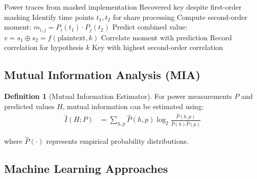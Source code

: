 \documentclass[11pt,a4paper]{article}
\theoremstyle{definition}
\newtheorem{definition}{Definition}[section]
\begin{document}
\begin{algorithm}
\caption{Second-Order Power Analysis}
\begin{algorithmic}[1]
\REQUIRE Power traces from masked implementation
\ENSURE Recovered key despite first-order masking
        \STATE Identify time points $t_1, t_2$ for share processing
        \STATE Compute second-order moment: $m_{i,j} = P_i(t_1) \cdot P_j(t_2)$
        \STATE Predict combined value: $v = s_1 \oplus s_2 = f(\text{plaintext}, k)$
        \STATE Correlate moment with prediction
    \ENDFOR
    \STATE Record correlation for hypothesis $k$
\ENDFOR
\RETURN Key with highest second-order correlation
\end{algorithmic}
\end{algorithm}

\subsection{Mutual Information Analysis (MIA)}

\begin{definition}[Mutual Information Estimator]
For power measurements $P$ and predicted values $H$, mutual information can be estimated using:
\begin{align}
\hat{I}(H; P) &= \sum_{h,p} \hat{P}(h,p) \log_2 \frac{\hat{P}(h,p)}{\hat{P}(h)\hat{P}(p)}
\end{align}

where $\hat{P}(\cdot)$ represents empirical probability distributions.
\end{definition}

\subsection{Machine Learning Approaches}
\end{document}
